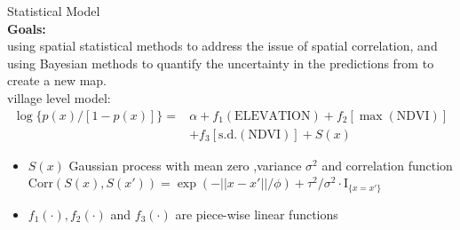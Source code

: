 \documentclass[11pt,compress,UTF8]{beamer}
\begin{document}
\begin{frame}{Statistical Model}
\citet{Diggle2007a}\\
\textbf{Goals:}\\
using spatial statistical methods to address the issue of spatial correlation, 
and using Bayesian methods to quantify the uncertainty 
in the predictions from \citet{Diggle1998} to create a new map.\\
{\color{red} village level model:}
\begin{equation*}
\begin{aligned}
\log\{p(x)/[1-p(x)] \}=& 
\alpha + f_{1}(\mathrm{ELEVATION}) + f_{2}[\max(\mathrm{NDVI})]\\
& + f_{3}[\mathrm{s.d.}(\mathrm{NDVI})]+S(x) %
\end{aligned}
\end{equation*}
\begin{itemize}
\item $S(x)$ Gaussian process with mean zero ,variance $\sigma^2$ 
and correlation function  $\mathrm{Corr}(S(x),S(x'))=\exp(-||x-x'||/\phi)+\tau^2/\sigma^2 \cdot \mathrm{I}_{\{x=x'\}}$
\item $f_{1}(\cdot),f_{2}(\cdot)$ and $f_{3}(\cdot)$ are piece-wise linear functions
\end{itemize}

\end{frame}

\begin{frame}
\begin{figure}
\centering
\end{figure}
\end{frame}
\end{document}

